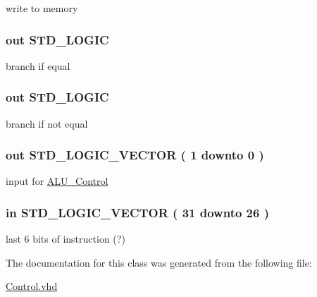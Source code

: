 write to memory 

\hypertarget{class_control_a8bcff3a33808999c1998531a90201ac6}{
\subsubsection[{\-Branch}]{ {\bfseries out } {\bfseries \-S\-T\-D\-\_\-\-L\-O\-G\-I\-C } }}\label{class_control_a8bcff3a33808999c1998531a90201ac6}


branch if equal 

\hypertarget{class_control_a24dd763afcb5d8a8d91e3c3f5a415704}{
\subsubsection[{\-Branch\-\_\-ne}]{ {\bfseries out } {\bfseries \-S\-T\-D\-\_\-\-L\-O\-G\-I\-C } }}\label{class_control_a24dd763afcb5d8a8d91e3c3f5a415704}


branch if not equal 

\hypertarget{class_control_accc0d3f810d226b65ebd44774daada7e}{
\subsubsection[{\-A\-L\-Uop}]{ {\bfseries out } {\bfseries \-S\-T\-D\-\_\-\-L\-O\-G\-I\-C\-\_\-\-V\-E\-C\-T\-O\-R (   1    downto    0  ) } }}\label{class_control_accc0d3f810d226b65ebd44774daada7e}


input for \hyperlink{class_a_l_u___control}{\-A\-L\-U\-\_\-\-Control} 

\hypertarget{class_control_a35120c002e477a6e77c738ea1aaa5505}{
\subsubsection[{\-Instruction}]{ {\bfseries in } {\bfseries \-S\-T\-D\-\_\-\-L\-O\-G\-I\-C\-\_\-\-V\-E\-C\-T\-O\-R (   31    downto    26  ) } }}\label{class_control_a35120c002e477a6e77c738ea1aaa5505}


last 6 bits of instruction (?) 



\-The documentation for this class was generated from the following file\-:\begin{DoxyCompactItemize}
\item 
\hyperlink{_control_8vhd}{\-Control.\-vhd}\end{DoxyCompactItemize}
